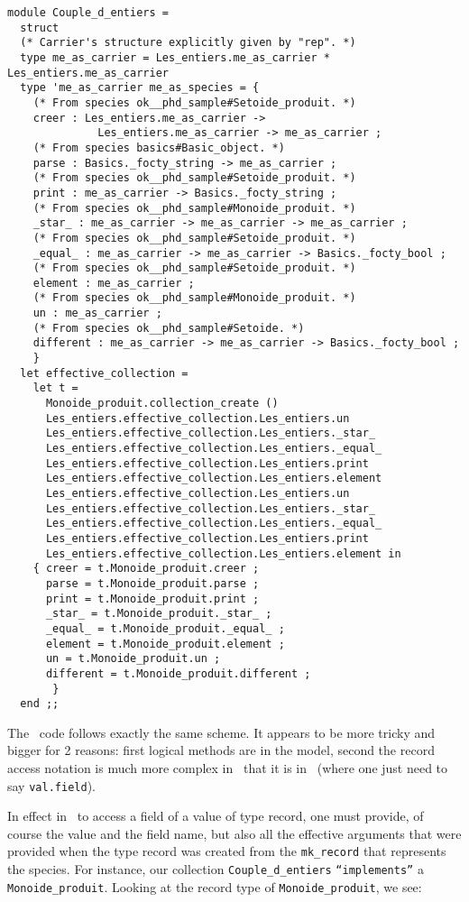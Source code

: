 {\begin{lstlisting}[language=MyOCaml, title=\ocaml\ code for collections]
module Couple_d_entiers =
  struct
  (* Carrier's structure explicitly given by "rep". *)
  type me_as_carrier = Les_entiers.me_as_carrier * Les_entiers.me_as_carrier
  type 'me_as_carrier me_as_species = {
    (* From species ok__phd_sample#Setoide_produit. *)
    creer : Les_entiers.me_as_carrier ->
              Les_entiers.me_as_carrier -> me_as_carrier ;
    (* From species basics#Basic_object. *)
    parse : Basics._focty_string -> me_as_carrier ;
    (* From species ok__phd_sample#Setoide_produit. *)
    print : me_as_carrier -> Basics._focty_string ;
    (* From species ok__phd_sample#Monoide_produit. *)
    _star_ : me_as_carrier -> me_as_carrier -> me_as_carrier ;
    (* From species ok__phd_sample#Setoide_produit. *)
    _equal_ : me_as_carrier -> me_as_carrier -> Basics._focty_bool ;
    (* From species ok__phd_sample#Setoide_produit. *)
    element : me_as_carrier ;
    (* From species ok__phd_sample#Monoide_produit. *)
    un : me_as_carrier ;
    (* From species ok__phd_sample#Setoide. *)
    different : me_as_carrier -> me_as_carrier -> Basics._focty_bool ;
    }
  let effective_collection =
    let t =
      Monoide_produit.collection_create ()
      Les_entiers.effective_collection.Les_entiers.un
      Les_entiers.effective_collection.Les_entiers._star_
      Les_entiers.effective_collection.Les_entiers._equal_
      Les_entiers.effective_collection.Les_entiers.print
      Les_entiers.effective_collection.Les_entiers.element
      Les_entiers.effective_collection.Les_entiers.un
      Les_entiers.effective_collection.Les_entiers._star_
      Les_entiers.effective_collection.Les_entiers._equal_
      Les_entiers.effective_collection.Les_entiers.print
      Les_entiers.effective_collection.Les_entiers.element in
    { creer = t.Monoide_produit.creer ;
      parse = t.Monoide_produit.parse ;
      print = t.Monoide_produit.print ;
      _star_ = t.Monoide_produit._star_ ;
      _equal_ = t.Monoide_produit._equal_ ;
      element = t.Monoide_produit.element ;
      un = t.Monoide_produit.un ;
      different = t.Monoide_produit.different ;
       }
  end ;;
\end{lstlisting}
}

The \coq\ code follows exactly the same scheme. It appears to be more
tricky and bigger for 2 reasons: first logical methods are in the
model, second the record access notation is much more complex in
\coq\ that it is in \ocaml\ (where one just need to say
{\tt val.field}).

In effect in \coq\, to access a field of a value of type record, one
must provide, of course the value and the field name, but also all the
effective arguments that were provided when the type record was
created from the {\tt mk\_record}
\label{mk-record-introduction2}
that represents the species.
For instance, our collection {\tt Couple\_d\_entiers}
{\tt ``implements''} a {\tt Monoide\_produit}. Looking at the record
type of {\tt Monoide\_produit}, we see:

